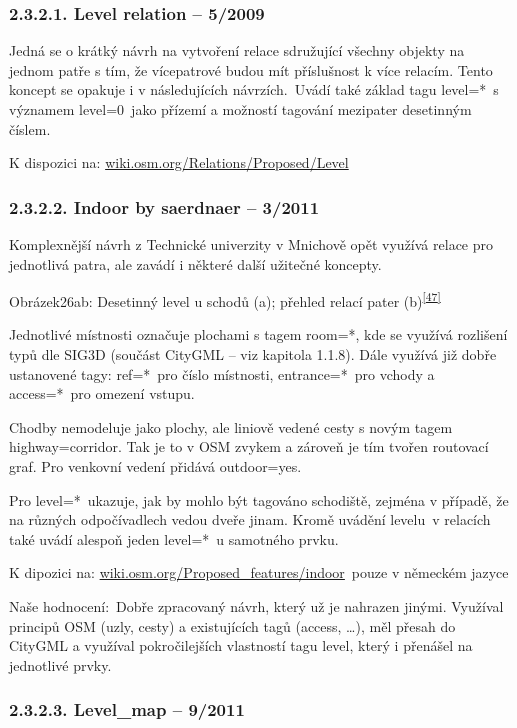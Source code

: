 \subsubsection{2.3.2.1. Level relation -- 5/2009}\label{level-relation-52009}

Jedná se o krátký návrh na vytvoření relace sdružující všechny objekty na jednom patře s tím, že vícepatrové budou mít příslušnost k více relacím. Tento koncept se opakuje i v následujících návrzích.~Uvádí také základ tagu level=*~s významem level=0~jako přízemí a možností tagování mezipater desetinným číslem.

K dispozici na: \href{}{wiki.osm.org/Relations/Proposed/Level}~

\subsubsection{2.3.2.2. Indoor by saerdnaer -- 3/2011}\label{indoor-by-saerdnaer-32011}

Komplexnější návrh z Technické univerzity v Mnichově opět využívá relace pro jednotlivá patra, ale zavádí i některé další užitečné koncepty.

Obrázek26ab: Desetinný level u schodů (a); přehled relací pater (b)\textsuperscript{\href{}{{[}47{]}}}

Jednotlivé místnosti označuje plochami s tagem room=*, kde se využívá rozlišení typů dle SIG3D (součást CityGML -- viz kapitola 1.1.8). Dále využívá již dobře ustanovené tagy: ref=*~pro číslo místnosti, entrance=*~pro vchody a access=*~pro omezení vstupu.

Chodby nemodeluje jako plochy, ale liniově vedené cesty s novým tagem highway=corridor. Tak je to v OSM zvykem a zároveň je tím tvořen routovací graf. Pro venkovní vedení přidává outdoor=yes.

Pro level=*~ukazuje, jak by mohlo být tagováno schodiště, zejména v případě, že na různých odpočívadlech vedou dveře jinam. Kromě uvádění levelu~v relacích také uvádí alespoň jeden level=*~u samotného prvku.

K dipozici na: \href{}{wiki.osm.org/Proposed\_features/indoor}~pouze v německém jazyce

Naše hodnocení:~Dobře zpracovaný návrh, který už je nahrazen jinými. Využíval principů OSM (uzly, cesty) a existujících tagů (access, \ldots{}), měl přesah do CityGML a využíval pokročilejších vlastností tagu level, který i přenášel na jednotlivé prvky.

\subsubsection{2.3.2.3. Level\_map -- 9/2011}\label{levelux5fmap-92011}

